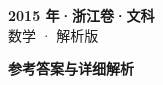\documentclass[zihao=-4, a4paper]{ctexart}
\begin{document}
\begin{center}
  {\Large\bfseries 2015 年·浙江卷·文科}\\[4pt]
  {\large 数学 · 解析版}
\end{center}
\medskip
{}

\clearpage
{}
\begin{center}{\Large\bfseries 参考答案与详细解析}\end{center}
\medskip

\end{document}
